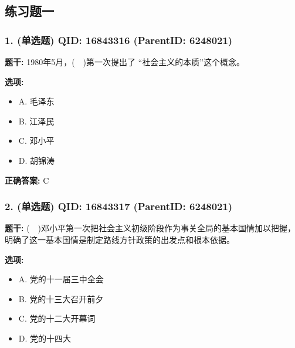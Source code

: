 \documentclass[12pt,UTF8]{ctexart}
\begin{document}
\subsection*{练习题一}

\subsubsection*{1. (单选题) \small QID: 16843316 (ParentID: 6248021)}

\textbf{题干:}
1980年5月，(  )第一次提出了 “社会主义的本质”这个概念。



\textbf{选项:}
\begin{itemize}[leftmargin=*]

  \item A. 毛泽东

  \item B. 江泽民

  \item C. 邓小平

  \item D. 胡锦涛

\end{itemize}

\textbf{正确答案:}
C

\vspace{0.3em}\hrulefill\vspace{0.7em}

\subsubsection*{2. (单选题) \small QID: 16843317 (ParentID: 6248021)}

\textbf{题干:}
(  )邓小平第一次把社会主义初级阶段作为事关全局的基本国情加以把握，明确了这一基本国情是制定路线方针政策的出发点和根本依据。



\textbf{选项:}
\begin{itemize}[leftmargin=*]

  \item A. 党的十一届三中全会

  \item B. 党的十三大召开前夕

  \item C. 党的十二大开幕词

  \item D. 党的十四大

\end{itemize}
\end{document}
